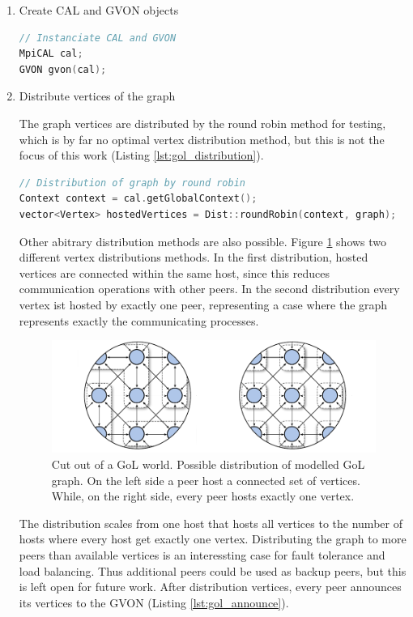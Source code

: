 \begin{enumerate}
\begin{enumerate}
\item Create CAL and GVON objects

  \begin{lstlisting}[language=C++, label=lst:, caption={\ }]
// Instanciate CAL and GVON
MpiCAL cal;
GVON gvon(cal);
  \end{lstlisting}

\item Distribute vertices of the graph

  The graph vertices are distributed by the round robin method for
  testing, which is by far no optimal vertex distribution method, but
  this is not the focus of this work (Listing \ref{lst:gol_distribution}).  

  \begin{lstlisting}[language=C++, label=lst:gol_distribution, caption={\ }]
// Distribution of graph by round robin
Context context = cal.getGlobalContext();
vector<Vertex> hostedVertices = Dist::roundRobin(context, graph);
  \end{lstlisting}

  Other abitrary distribution methods are also possible. Figure
  \ref{fig:gol_mapping} shows two different vertex distributions
  methods.  In the first distribution, hosted vertices are connected
  within the same host, since this reduces communication operations
  with other peers.  In the second distribution every vertex ist
  hosted by exactly one peer, representing a case where the graph
  represents exactly the communicating processes.

  \begin{figure}[H]
    \centering
    \includegraphics[width=\textwidth]{graphics/40_gol_mapping}
    \caption{Cut out of a GoL world. Possible distribution of modelled
      GoL graph. On the left side a peer host a connected set of
      vertices. While, on the right side, every peer hosts exactly one
      vertex.}
    \label{fig:gol_mapping}
  \end{figure}

  The distribution scales from one host that hosts all vertices to the
  number of hosts where every host get exactly one
  vertex. Distributing the graph to more peers than available vertices
  is an interessting case for fault tolerance and load balancing. Thus
  additional peers could be used as backup peers, but this is left
  open for future work.  After distribution vertices, every peer
  announces its vertices to the GVON (Listing \ref{lst:gol_announce}).


\end{enumerate}
\end{enumerate}
